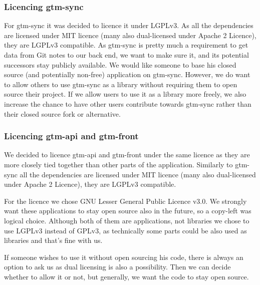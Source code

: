 \subsubsection{Licencing gtm-sync}\label{subsubsec:licencing-gtm-sync}
For gtm-sync it was decided to licence it under LGPLv3.
As all the dependencies are licensed under MIT licence (many also dual-licensed under Apache 2 Licence), they are LGPLv3 compatible.
As gtm-sync is pretty much a requirement to get data from Git notes to our back end, we want to make sure it,
and its potential successors stay publicly available.
We would like someone to base his closed source (and potentially non-free) application on gtm-sync. %
However, we do want to allow others to use gtm-sync as a library without requiring them to open source their project.
If we allow users to use it as a library more freely, we also increase the chance to have other users contribute towards gtm-sync
rather than their closed source fork or alternative.

\subsubsection{Licencing gtm-api and gtm-front}\label{subsubsec:licencing-gtm-api-and-gtm-front}
We decided to licence gtm-api and gtm-front under the same licence as they are more closely tied together than other parts of the application.
Similarly to gtm-sync all the dependencies are licensed under MIT licence (many also dual-licensed under Apache 2 Licence), they are LGPLv3 compatible.

For the licence we chose GNU Lesser General Public Licence v3.0.
We strongly want these applications to stay open source also in the future, so a copy-left was logical choice.
Although both of them are applications, not libraries we chose to use LGPLv3 instead of GPLv3, as technically some parts
could be also used as libraries and that's fine with us.

If someone wishes to use it without open sourcing his code, there is always an option to ask us as dual licensing is also a possibility. %
Then we can decide whether to allow it or not, but generally, we want the code to stay open source.
